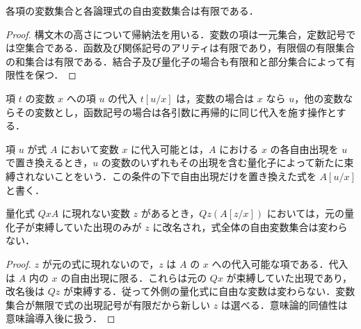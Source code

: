 \begin{prop}[自由変数集合の有限性]
各項の変数集合と各論理式の自由変数集合は有限である．
\end{prop}
\begin{proof}
構文木の高さについて帰納法を用いる．変数の項は一元集合，定数記号では空集合である．函数及び関係記号のアリティは有限であり，有限個の有限集合の和集合は有限である．結合子及び量化子の場合も有限和と部分集合によって有限性を保つ．
\end{proof}
\begin{defn}[項への代入]
項 $t$ の変数 $x$ への項 $u$ の代入 $t[u/x]$ は，変数の場合は $x$ なら $u$，他の変数ならその変数とし，函数記号の場合は各引数に再帰的に同じ代入を施す操作とする．
\end{defn}
\begin{defn}[式への代入可能性]
項 $u$ が式 $A$ において変数 $x$ に代入可能とは，$A$ における $x$ の各自由出現を $u$ で置き換えるとき，$u$ の変数のいずれもその出現を含む量化子によって新たに束縛されないことをいう．この条件の下で自由出現だけを置き換えた式を $A[u/x]$ と書く．
\end{defn}
\begin{prop}[束縛変数の新しい記号への改名]
量化式 $QxA$ に現れない変数 $z$ があるとき，$Qz(A[z/x])$ においては，元の量化子が束縛していた出現のみが $z$ に改名され，式全体の自由変数集合は変わらない．
\end{prop}
\begin{proof}
$z$ が元の式に現れないので，$z$ は $A$ の $x$ への代入可能な項である．代入は $A$ 内の $x$ の自由出現に限る．これらは元の $Qx$ が束縛していた出現であり，改名後は $Qz$ が束縛する．従って外側の量化式に自由な変数は変わらない．変数集合が無限で式の出現記号が有限だから新しい $z$ は選べる．意味論的同値性は意味論導入後に扱う．
\end{proof}

